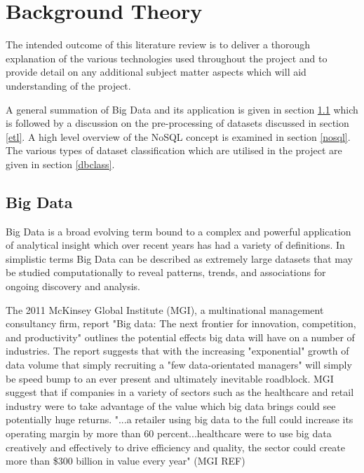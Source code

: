 \chapter{Background Theory}
The intended outcome of this literature review is to deliver a thorough explanation of the various technologies used throughout the project and to provide detail on any additional subject matter aspects which will aid understanding of the project. 

A general summation of Big Data and its application is given in section \ref{bigdata} which is followed by a discussion on the pre-processing of datasets discussed in section \ref{etl}. A high level overview of the NoSQL concept is examined in section \ref{nosql}. The various types of dataset classification which are utilised in the project are given in section \ref{dbclass}.

\section{Big Data}\label{bigdata}
Big Data is a broad evolving term bound to a complex and powerful application of analytical insight which over recent years has had a variety of definitions. In simplistic terms Big Data can be described as extremely large datasets that may be studied computationally to reveal patterns, trends, and associations for ongoing discovery and analysis.

The 2011 McKinsey Global Institute (MGI), a multinational management consultancy firm, report "Big data: The next frontier for innovation, competition, and productivity" outlines the potential effects big data will have on a number of industries. The report suggests that with the increasing "exponential" growth of data volume that simply recruiting a "few data-orientated managers" will simply be speed bump to an ever present and ultimately inevitable roadblock. MGI suggest that if companies in a variety of sectors such as the healthcare and retail industry were to take advantage of the value which big data brings could see potentially huge returns. "...a retailer using big data to the full could increase its operating margin by more than 60 percent...healthcare were to use big data creatively and effectively to drive efficiency and quality, the sector could create more than \$300 billion in value every year" (MGI REF)

